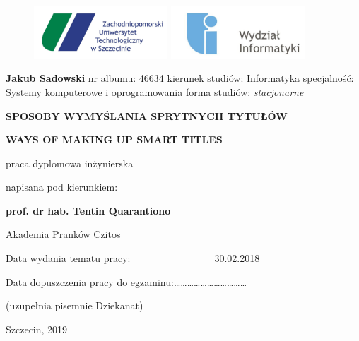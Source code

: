 \documentclass [12pt]{report}
\begin{document}
\begin{figure}
\centering

\includegraphics[width=5cm]{zut}
\quad
\quad\quad\quad\quad\quad\quad\quad\quad\quad\quad\quad
\includegraphics[width=5cm]{wi}
\end{figure}



\begin{center}

\end {center}
\begin{center}
\textbf {\large Jakub Sadowski} \newline
nr albumu: 46634\newline
kierunek studiów: Informatyka\newline
specjalność: Systemy komputerowe i oprogramowania\newline
forma studiów: 
\textsl {stacjonarne}\newline

\end {center}

\begin{center}
\textbf {\large SPOSOBY WYMYŚLANIA SPRYTNYCH TYTUŁÓW}\newline

\textbf {\large WAYS OF MAKING UP SMART TITLES}\newline
\end {center}
\begin{center}
\vspace {1.2cm}
praca dyplomowa inżynierska \newline

napisana pod kierunkiem:\newline

\textbf {prof. dr hab. Tentin Quarantiono}\newline

Akademia Pranków Czitos\newline
\end {center}

\small{Data wydania tematu pracy:~~~~~~~~~~~~~~~~~30.02.2018}\newline

\small {Data dopuszczenia pracy do egzaminu:……………………………}

\small {(uzupełnia pisemnie Dziekanat)}\newline

\begin {center}
\begin {flushright}
\large {Szczecin, 2019}\newline
\end {flushright}
\end {center}
\end{document}
